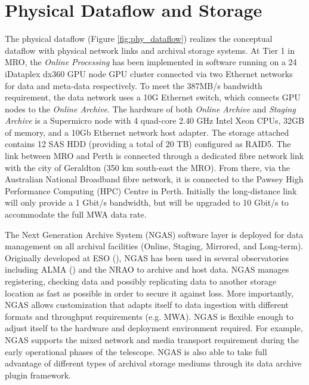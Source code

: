 \section{Physical Dataflow and Storage}
The physical dataflow (Figure \ref{fig:phy_dataflow}) realizes the conceptual dataflow with physical network links and archival storage systems. At Tier 1 in MRO, the \emph{Online Processing} has been implemented in software running on a 24 iDataplex dx360 GPU node GPU cluster connected via two Ethernet networks for data and meta-data respectively. To meet the 387MB/s bandwidth requirement, the data network uses a 10G Ethernet switch, which connects GPU nodes to the \emph{Online Archive}. The hardware of both \emph{Online Archive} and \emph{Staging Archive} is a Supermicro node with 4 quad-core 2.40 GHz Intel Xeon CPUs, 32GB of memory, and a 10Gb Ethernet network host adapter. The storage attached contains 12 SAS HDD (providing a total of 20 TB) configured as RAID5. The link between MRO and Perth is connected through a dedicated fibre network link with the city of Geraldton (350 km south-east the MRO). From there, via the Australian National Broadband fibre network, it is connected to the Pawsey High Performance Computing (HPC) Centre in Perth. Initially the long-distance link will only provide a 1 Gbit/s bandwidth, but will be upgraded to 10 Gbit/s to accommodate the full MWA data rate.

The Next Generation Archive System (NGAS) software layer is deployed for data management on all archival facilities (Online, Staging, Mirrored, and Long-term). Originally developed at ESO (\cite{wicenec2007eso}), NGAS has been used in several observatories including ALMA (\cite{wicenec2004alma}) and the NRAO to archive and host data. NGAS manages registering, checking data and possibly replicating data to another storage location as fast as possible in order to secure it against loss. More importantly, NGAS allows customization that adapts itself to data ingestion with different formats and throughput requirements (e.g. MWA). NGAS is flexible enough to adjust itself to the hardware and deployment environment required. For example, NGAS supports the mixed network and media transport requirement during the early operational phases of the telescope. NGAS is also able to take full advantage of different types of archival storage mediums through its data archive plugin framework.

